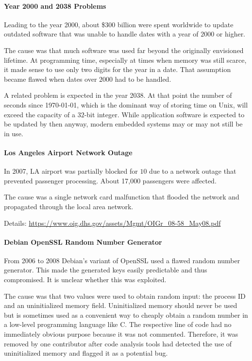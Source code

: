 \paragraph{Year 2000 and 2038 Problems}
Leading to the year 2000, about \$$300$ billion were spent worldwide to update outdated software that was unable to handle dates with a year of $2000$ or higher.

The cause was that much software was used far beyond the originally envisioned lifetime.
At programming time, especially at times when memory was still scarce, it made sense to use only two digits for the year in a date.
That assumption became flawed when dates over $2000$ had to be handled.

A related problem is expected in the year 2038.
At that point the number of seconds since 1970-01-01, which is the dominant way of storing time on Unix, will exceed the capacity of a $32$-bit integer.
While application software is expected to be updated by then anyway, modern embedded systems may or may not still be in use.

\paragraph{Los Angeles Airport Network Outage}
In 2007, LA airport was partially blocked for $10$ due to a network outage that prevented passenger processing.
About 17,000 passengers were affected.

The cause was a single network card malfunction that flooded the network and propagated through the local area network.

Details: \url{https://www.oig.dhs.gov/assets/Mgmt/OIGr_08-58_May08.pdf}

\paragraph{Debian OpenSSL Random Number Generator}
From 2006 to 2008 Debian's variant of OpenSSL used a flawed random number generator.
This made the generated keys easily predictable and thus compromised.
It is unclear whether this was exploited.

The cause was that two values were used to obtain random input: the process ID and an uninitialized memory field.
Uninitialized memory should never be used but is sometimes used as a convenient way to cheaply obtain a random number in a low-level programming language like C.
The respective line of code had no immediately obvious purpose because it was not commented.
Therefore, it was removed by one contributor after code analysis tools had detected the use of uninitialized memory and flagged it as a potential bug.

